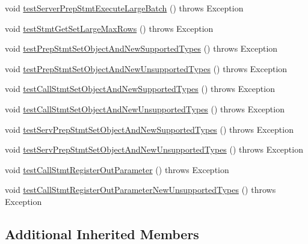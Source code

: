 \begin{DoxyCompactItemize}
\item 
void \mbox{\hyperlink{classtestsuite_1_1simple_1_1jdbc42_1_1_statements_test_ab27da757519cadcb44b5fdc7a17dcd3c}{test\+Server\+Prep\+Stmt\+Execute\+Large\+Batch}} ()  throws Exception 
\item 
void \mbox{\hyperlink{classtestsuite_1_1simple_1_1jdbc42_1_1_statements_test_ac09050d8cc2762e4ac0ade3ee4e1973d}{test\+Stmt\+Get\+Set\+Large\+Max\+Rows}} ()  throws Exception 
\item 
void \mbox{\hyperlink{classtestsuite_1_1simple_1_1jdbc42_1_1_statements_test_a169f954f7f0fce6437936d4f55350cef}{test\+Prep\+Stmt\+Set\+Object\+And\+New\+Supported\+Types}} ()  throws Exception 
\item 
void \mbox{\hyperlink{classtestsuite_1_1simple_1_1jdbc42_1_1_statements_test_ae14fc2acf440e682b053d9292ceac68a}{test\+Prep\+Stmt\+Set\+Object\+And\+New\+Unsupported\+Types}} ()  throws Exception 
\item 
void \mbox{\hyperlink{classtestsuite_1_1simple_1_1jdbc42_1_1_statements_test_a3efa47537a044f51e3432a94eb0a332d}{test\+Call\+Stmt\+Set\+Object\+And\+New\+Supported\+Types}} ()  throws Exception 
\item 
void \mbox{\hyperlink{classtestsuite_1_1simple_1_1jdbc42_1_1_statements_test_aa7c9f0030a70f2ad355ce05b9676e4ff}{test\+Call\+Stmt\+Set\+Object\+And\+New\+Unsupported\+Types}} ()  throws Exception 
\item 
void \mbox{\hyperlink{classtestsuite_1_1simple_1_1jdbc42_1_1_statements_test_aa5a73b4c46d2f106d5c1b6c6e807598b}{test\+Serv\+Prep\+Stmt\+Set\+Object\+And\+New\+Supported\+Types}} ()  throws Exception 
\item 
void \mbox{\hyperlink{classtestsuite_1_1simple_1_1jdbc42_1_1_statements_test_adb018c44c7c109adf53c94cd178fc10f}{test\+Serv\+Prep\+Stmt\+Set\+Object\+And\+New\+Unsupported\+Types}} ()  throws Exception 
\item 
void \mbox{\hyperlink{classtestsuite_1_1simple_1_1jdbc42_1_1_statements_test_ac1583a9581fd11b052731aa60807c216}{test\+Call\+Stmt\+Register\+Out\+Parameter}} ()  throws Exception 
\item 
void \mbox{\hyperlink{classtestsuite_1_1simple_1_1jdbc42_1_1_statements_test_a4099b78a8b971a6d6948d205c3cc523b}{test\+Call\+Stmt\+Register\+Out\+Parameter\+New\+Unsupported\+Types}} ()  throws Exception 
\end{DoxyCompactItemize}
\subsection*{Additional Inherited Members}


